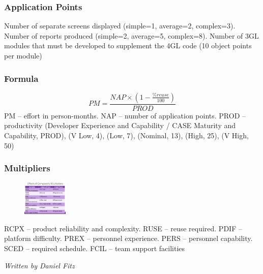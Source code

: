 \documentclass[10pt,a4paper]{article}
\begin{document}
\begin{landscape}
\begin{multicols}{3}
\subsubsection{Application Points}
Number of separate screens displayed (simple=1, average=2, complex=3). Number of reports produced (simple=2, average=5, complex=8). Number of 3GL modules that must be developed to supplement the 4GL code (10 object points per module)
\subsubsection{Formula}
\begin{equation*}
    PM= \frac{NAP\times\left(1 - \frac{\%reuse}{100}\right)}{PROD}
\end{equation*}
PM -- effort in person-months. NAP -- number of application points. PROD -- productivity
(Developer Experience and Capability / CASE Maturity and Capability, PROD), (V Low, 4), (Low, 7), (Nominal, 13), (High, 25), (V High, 50)
\subsubsection{Multipliers}
\begin{figure}
    \includegraphics[width=0.19\textwidth]{Effect}
\end{figure}
RCPX -- product reliability and complexity. RUSE -- reuse required. PDIF -- platform difficulty. PREX -- personnel experience. PERS -- personnel capability. SCED -- required schedule. FCIL -- team support facilities


\vfill\vspace{1em}\textit{Written by Daniel Fitz}
\end{multicols}
\end{landscape}
\end{document}
